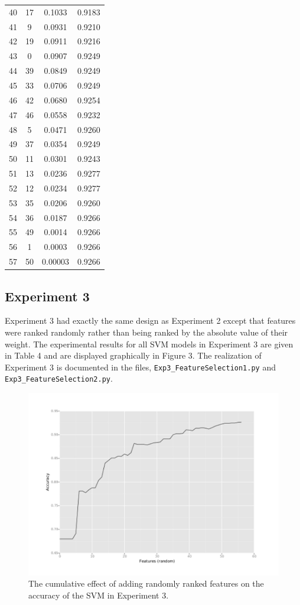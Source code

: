 \documentclass[12pt]{article}
\begin{document}
\begin{longtable}[!htbp]{lccc}
40 & 17 & 0.1033 & 0.9183\\
41 & 9 & 0.0931 & 0.9210\\
42 & 19 & 0.0911 & 0.9216\\
43 & 0 & 0.0907 & 0.9249\\
44 & 39 & 0.0849 & 0.9249\\
45 & 33 & 0.0706 & 0.9249\\
46 & 42 & 0.0680 & 0.9254\\
47 & 46 & 0.0558 & 0.9232\\
48 & 5 & 0.0471 & 0.9260\\
49 & 37 & 0.0354 & 0.9249\\
50 & 11 & 0.0301 & 0.9243\\
51 & 13 & 0.0236 & 0.9277\\
52 & 12 & 0.0234 & 0.9277\\
53 & 35 & 0.0206 & 0.9260\\
54 & 36 & 0.0187 & 0.9266\\
55 & 49 & 0.0014 & 0.9266\\
56 & 1 & 0.0003 & 0.9266\\
57 & 50 & 0.00003 & 0.9266\\
\end{longtable}

\subsection{Experiment 3}
Experiment 3 had exactly the same design as Experiment 2 except that features were ranked randomly rather than being ranked by the absolute value of their weight. The experimental results for all SVM models in Experiment 3 are given in Table 4 and are displayed graphically in Figure 3.  The realization of Experiment 3 is documented in the files, \verb|Exp3_FeatureSelection1.py| and \verb|Exp3_FeatureSelection2.py|.

\begin{figure}
	\begin{center}
		\includegraphics{exp3_accuracies.pdf}
		\caption{The cumulative effect of adding randomly ranked features on the accuracy of the SVM in Experiment 3. }
	\end{center}
\end{figure}
\end{document}
